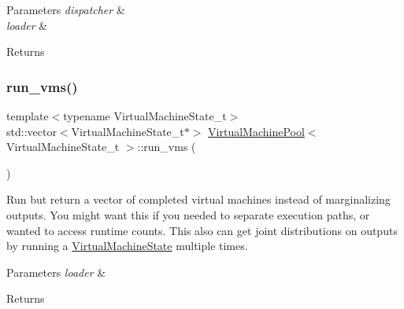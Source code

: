 \begin{DoxyParams}{Parameters}
{\em dispatcher} & \\
\hline
{\em loader} & \\
\hline
\end{DoxyParams}
\begin{DoxyReturn}{Returns}

\end{DoxyReturn}
\mbox{\label{class_virtual_machine_pool_a82da0edd512bd5b112583d1ead3db151}} 
\subsubsection{\texorpdfstring{run\+\_\+vms()}{run\_vms()}}
{\footnotesize\ttfamily template$<$typename Virtual\+Machine\+State\+\_\+t$>$ \\
std\+::vector$<$Virtual\+Machine\+State\+\_\+t$\ast$$>$ \hyperlink{class_virtual_machine_pool}{Virtual\+Machine\+Pool}$<$ Virtual\+Machine\+State\+\_\+t $>$\+::run\+\_\+vms (\begin{DoxyParamCaption}{ }\end{DoxyParamCaption})\hspace{0.3cm}{\ttfamily [inline]}}



Run but return a vector of completed virtual machines instead of marginalizing outputs. You might want this if you needed to separate execution paths, or wanted to access runtime counts. This also can get joint distributions on outputs by running a \hyperlink{class_virtual_machine_state}{Virtual\+Machine\+State} multiple times. 


\begin{DoxyParams}{Parameters}
{\em loader} & \\
\hline
\end{DoxyParams}
\begin{DoxyReturn}{Returns}

\end{DoxyReturn}
\mbox{\label{class_virtual_machine_pool_a903f749af76ea1e62222071a1e0a3034}} 
